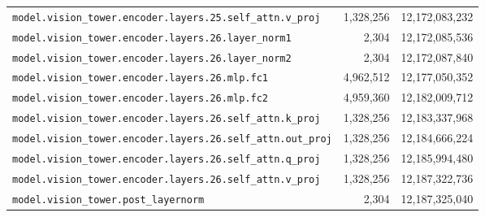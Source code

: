\documentclass[10pt,a4paper]{article}
\theoremstyle{definition}
\begin{document}
\begin{appendices}
\begin{longtable}{p{9.5cm}rr}
\texttt{model.\allowbreak{}vision\_tower.\allowbreak{}encoder.\allowbreak{}layers.\allowbreak{}25.\allowbreak{}self\_attn.\allowbreak{}v\_proj} & 1,328,256 & 12,172,083,232 \\
\texttt{model.\allowbreak{}vision\_tower.\allowbreak{}encoder.\allowbreak{}layers.\allowbreak{}26.\allowbreak{}layer\_norm1} & 2,304 & 12,172,085,536 \\
\texttt{model.\allowbreak{}vision\_tower.\allowbreak{}encoder.\allowbreak{}layers.\allowbreak{}26.\allowbreak{}layer\_norm2} & 2,304 & 12,172,087,840 \\
\texttt{model.\allowbreak{}vision\_tower.\allowbreak{}encoder.\allowbreak{}layers.\allowbreak{}26.\allowbreak{}mlp.\allowbreak{}fc1} & 4,962,512 & 12,177,050,352 \\
\texttt{model.\allowbreak{}vision\_tower.\allowbreak{}encoder.\allowbreak{}layers.\allowbreak{}26.\allowbreak{}mlp.\allowbreak{}fc2} & 4,959,360 & 12,182,009,712 \\
\texttt{model.\allowbreak{}vision\_tower.\allowbreak{}encoder.\allowbreak{}layers.\allowbreak{}26.\allowbreak{}self\_attn.\allowbreak{}k\_proj} & 1,328,256 & 12,183,337,968 \\
\texttt{model.\allowbreak{}vision\_tower.\allowbreak{}encoder.\allowbreak{}layers.\allowbreak{}26.\allowbreak{}self\_attn.\allowbreak{}out\_proj} & 1,328,256 & 12,184,666,224 \\
\texttt{model.\allowbreak{}vision\_tower.\allowbreak{}encoder.\allowbreak{}layers.\allowbreak{}26.\allowbreak{}self\_attn.\allowbreak{}q\_proj} & 1,328,256 & 12,185,994,480 \\
\texttt{model.\allowbreak{}vision\_tower.\allowbreak{}encoder.\allowbreak{}layers.\allowbreak{}26.\allowbreak{}self\_attn.\allowbreak{}v\_proj} & 1,328,256 & 12,187,322,736 \\
\texttt{model.\allowbreak{}vision\_tower.\allowbreak{}post\_layernorm} & 2,304 & 12,187,325,040 \\
\end{longtable}
\end{appendices}
\end{document}
